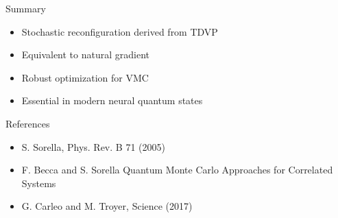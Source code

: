 \documentclass{beamer}
\begin{document}
\begin{frame}{Summary}

\begin{itemize}
\item Stochastic reconfiguration derived from TDVP
\item Equivalent to natural gradient
\item Robust optimization for VMC
\item Essential in modern neural quantum states
\end{itemize}
\end{frame}

\begin{frame}{References}

\begin{itemize}

\item S. Sorella, Phys. Rev. B 71 (2005)

\item F. Becca and S. Sorella  
Quantum Monte Carlo Approaches for Correlated Systems

\item G. Carleo and M. Troyer, Science (2017)

\end{itemize}

\end{frame}
\end{document}
